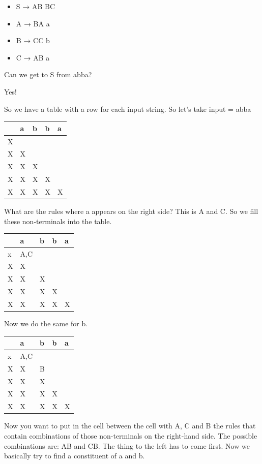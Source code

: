 \documentclass[
  11pt,
  british,
]{article}
\providecommand{\tightlist}{%
  \setlength{\itemsep}{0pt}\setlength{\parskip}{0pt}}
\begin{document}
\begin{itemize}
\tightlist
\item
  S → AB \textbar{} BC
\item
  A → BA \textbar{} a
\item
  B → CC \textbar{} b
\item
  C → AB \textbar{} a
\end{itemize}

Can we get to S from abba?

Yes!

So we have a table with a row for each input string. So let's take input
= abba

\begin{longtable}[]{@{}lllll@{}}
\toprule
& a & b & b & a \\
\midrule
\endhead
X & & & & \\
X & X & & & \\
X & X & X & & \\
X & X & X & X & \\
X & X & X & X & X \\
\bottomrule
\end{longtable}

What are the rules where a appears on the right side? This is A and C.
So we fill these non-terminals into the table.

\begin{longtable}[]{@{}lllll@{}}
\toprule
& a & b & b & a \\
\midrule
\endhead
x & A,C & & & \\
X & X & & & \\
X & X & X & & \\
X & X & X & X & \\
X & X & X & X & X \\
\bottomrule
\end{longtable}

Now we do the same for b.

\begin{longtable}[]{@{}lllll@{}}
\toprule
& a & b & b & a \\
\midrule
\endhead
x & A,C & & & \\
X & X & B & & \\
X & X & X & & \\
X & X & X & X & \\
X & X & X & X & X \\
\bottomrule
\end{longtable}

Now you want to put in the cell between the cell with A, C and B the
rules that contain combinations of those non-terminals on the right-hand
side. The possible combinations are: AB and CB. The thing to the left
has to come first. Now we basically try to find a constituent of a and
b.
\end{document}

